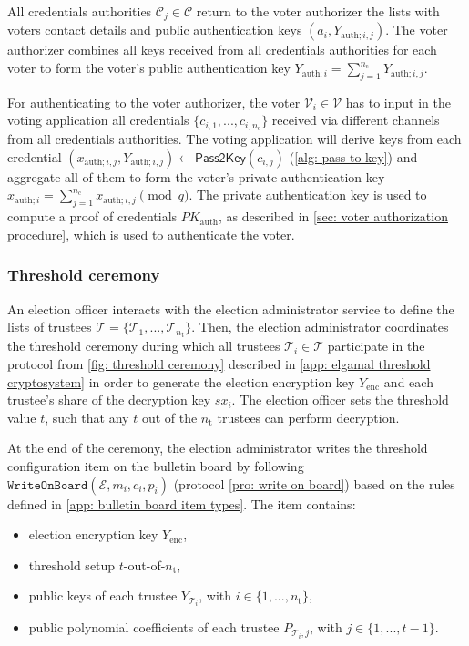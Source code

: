 All credentials authorities $\mathcal{C}_j \in \boldsymbol{\mathcal{C}}$ return to the voter authorizer the lists with voters contact details and public authentication keys $(a_i, Y_{\mathrm{auth}; i,j})$. The voter authorizer combines all keys received from all credentials authorities for each voter to form the voter's public authentication key $Y_{\mathrm{auth}; i} = \sum_{j=1}^{n_\mathrm{c}} Y_{\mathrm{auth}; i, j}$.

For authenticating to the voter authorizer, the voter $\mathcal{V}_i \in \boldsymbol{\mathcal{V}}$ has to input in the voting application all credentials $\{ c_{i, 1}, ..., c_{i, n_\mathrm{c}} \}$ received via different channels from all credentials authorities. The voting application will derive keys from each credential $(x_{\mathrm{auth}; i, j}, Y_{\mathrm{auth}; i, j}) \gets \mathsf{Pass2Key}(c_{i, j})$ (\cref{alg: pass to key}) and aggregate all of them to form the voter's private authentication key $x_{\mathrm{auth}; i} = \sum_{j=1}^{n_\mathrm{c}} x_{\mathrm{auth}; i, j} \pmod q$. The private authentication key is used to compute a proof of credentials $PK_\mathrm{auth}$, as described in \cref{sec: voter authorization procedure}, which is used to authenticate the voter.


\subsubsection{Threshold ceremony} \label{sec: threshold ceremony}
An election officer interacts with the election administrator service to define the lists of trustees $\boldsymbol{\mathcal{T}} = \{ \mathcal{T}_1, ..., \mathcal{T}_{n_\mathrm{t}} \}$. Then, the election administrator coordinates the threshold ceremony during which all trustees $\mathcal{T}_i \in \boldsymbol{\mathcal{T}}$ participate in the protocol from \cref{fig: threshold ceremony} described in \cref{app: elgamal threshold cryptosystem} in order to generate the election encryption key $Y_\mathrm{enc}$ and each trustee's share of the decryption key $sx_i$. The election officer sets the threshold value $t$, such that any $t$ out of the $n_\mathrm{t}$ trustees can perform decryption.

At the end of the ceremony, the election administrator writes the threshold configuration item on the bulletin board by following $\mathtt{WriteOnBoard}(\mathcal{E}, m_i, c_i, p_i)$ (protocol \ref{pro: write on board}) based on the rules defined in \cref{app: bulletin board item types}. The item contains:
\begin{itemize}
    \item election encryption key $Y_\mathrm{enc}$,
    \item threshold setup $t$-out-of-$n_\mathrm{t}$,
    \item public keys of each trustee $Y_{\mathcal{T}_i}$, with $i \in \{1, ..., n_\mathrm{t}\}$,
    \item public polynomial coefficients of each trustee $P_{\mathcal{T}_i,j}$, with $j \in \{1, ..., t-1 \}$.
\end{itemize}


